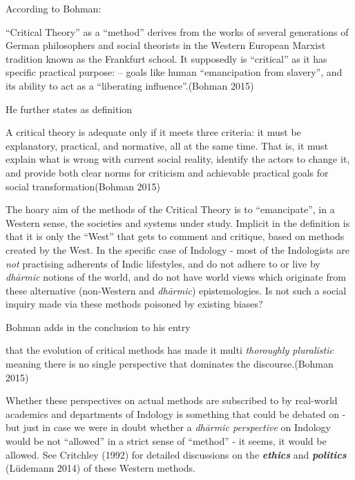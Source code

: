 According to Bohman:
\begin{myquote}
``Critical Theory'' as a ``method'' derives from the works of several generations of German philosophers and social theorists in the Western European Marxist tradition known as the Frankfurt school. It supposedly is ``critical'' as it has specific practical purpose: -- goals like human ``emancipation from slavery'', and its ability to act as a ``liberating influence''.\hfill (Bohman 2015)
\end{myquote}

He further states as definition
\begin{myquote}
A critical theory is adequate only if it meets three criteria: it must be explanatory, practical, and normative, all at the same time. That is, it must explain what is wrong with current social reality, identify the actors to change it, and provide both clear norms for criticism and achievable practical goals for social transformation\hfill (Bohman 2015)
\end{myquote}

\newpage

The hoary aim of the methods of the Critical Theory is to ``emancipate'', in a Western sense, the societies and systems under study. Implicit in the definition is that it is only the ``West'' that gets to comment and critique, based on methods created by the West. In the specific case of Indology - most of the Indologists are {\sl not} practising adherents of Indic lifestyles, and do not adhere to or live by {\sl dhārmic} notions of the world, and do not have world views which originate from these alternative (non-Western and {\sl dhārmic}) epistemologies. Is not such a social inquiry made via these methods poisoned by existing biases?

Bohman adds in the conclusion to his entry
\begin{myquote}
that the evolution of critical methods has made it multi {\sl thoroughly pluralistic} meaning there is no single perspective that dominates the discourse.\hfill (Bohman 2015)
\end{myquote}

Whether these perspectives on actual methods are subscribed to by real-world  academics and departments of Indology is something that could be debated on - but just in case we were in doubt whether a {\sl dhārmic perspective} on Indology would be  not ``allowed'' in a strict sense of ``method'' - it seems, it would be allowed. See Critchley (1992) for detailed discussions on the {{\sl\bfseries ethics}\relax} and {{\sl\bfseries politics}\relax} (Lüdemann 2014) of these Western methods.

